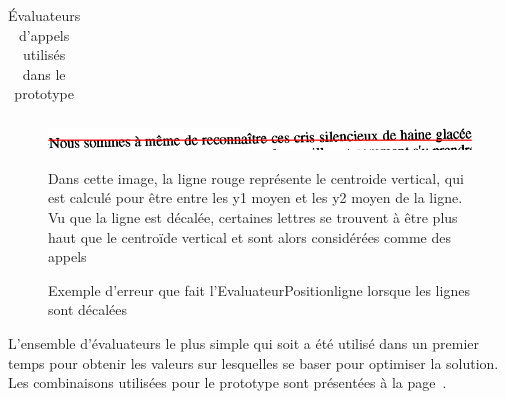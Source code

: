 \begin{table}
\begin{tabular}{| p{4cm} | p{12cm} |}
    \hline
\end{tabular}
\begin{figure}
\centerline{\includegraphics{figures/exemple-ligne-decalee.png}}
\caption{Exemple d'erreur que fait l'EvaluateurPositionligne lorsque les lignes sont décalées}{Dans cette image, la ligne rouge représente le centroide vertical, qui est calculé pour être entre les y1 moyen et les y2 moyen de la ligne. Vu que la ligne est décalée, certaines lettres se trouvent à être plus haut que le centroïde vertical et sont alors considérées comme des appels}
\label{erreur-evaluateurpositionligne}
\end{figure}
\label{tableau-evaluateurs}
\caption{Évaluateurs d'appels utilisés dans le prototype}
\end{table}
L'ensemble d'évaluateurs le plus simple qui soit a été utilisé dans un premier temps pour obtenir les valeurs sur lesquelles se baser pour optimiser la solution. Les combinaisons utilisées pour le prototype sont présentées à la page~\pageref{combinaisons-evaluateurs}.
